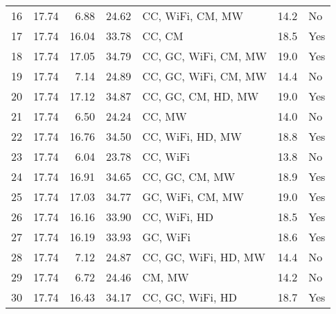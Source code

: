\begin{tabular}{lrrrlll}
16 &                17.74 &             6.88 &        24.62 &          CC, WiFi, CM, MW &                 14.2 &   No \\
17 &                17.74 &            16.04 &        33.78 &                    CC, CM &                 18.5 &  Yes \\
18 &                17.74 &            17.05 &        34.79 &      CC, GC, WiFi, CM, MW &                 19.0 &  Yes \\
19 &                17.74 &             7.14 &        24.89 &      CC, GC, WiFi, CM, MW &                 14.4 &   No \\
20 &                17.74 &            17.12 &        34.87 &        CC, GC, CM, HD, MW &                 19.0 &  Yes \\
21 &                17.74 &             6.50 &        24.24 &                    CC, MW &                 14.0 &   No \\
22 &                17.74 &            16.76 &        34.50 &          CC, WiFi, HD, MW &                 18.8 &  Yes \\
23 &                17.74 &             6.04 &        23.78 &                  CC, WiFi &                 13.8 &   No \\
24 &                17.74 &            16.91 &        34.65 &            CC, GC, CM, MW &                 18.9 &  Yes \\
25 &                17.74 &            17.03 &        34.77 &          GC, WiFi, CM, MW &                 19.0 &  Yes \\
26 &                17.74 &            16.16 &        33.90 &              CC, WiFi, HD &                 18.5 &  Yes \\
27 &                17.74 &            16.19 &        33.93 &                  GC, WiFi &                 18.6 &  Yes \\
28 &                17.74 &             7.12 &        24.87 &      CC, GC, WiFi, HD, MW &                 14.4 &   No \\
29 &                17.74 &             6.72 &        24.46 &                    CM, MW &                 14.2 &   No \\
30 &                17.74 &            16.43 &        34.17 &          CC, GC, WiFi, HD &                 18.7 &  Yes \\
\bottomrule
\end{tabular}
